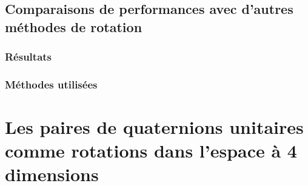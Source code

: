 	\subsection{Comparaisons de performances avec d'autres méthodes de rotation}
		
		\subsubsection{Résultats}
			
		\subsubsection{Méthodes utilisées}
			
\section{Les paires de quaternions unitaires comme rotations dans l'espace à 4 dimensions}